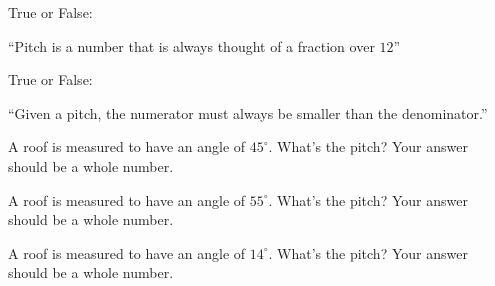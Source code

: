 \documentclass[noauthor,nooutcomes]{ximera}
\author{Bart Snapp}
\begin{document}
\maketitle


\begin{exercise}
  True or False:

  ``Pitch is a number that is always thought of a fraction over $12$''

  
\end{exercise}


\begin{exercise}
  True or False:
  
  ``Given a pitch, the numerator must always be smaller than the denominator.''
\end{exercise}

\begin{exercise}
  A roof is measured to have an angle of $45^\circ$. What's the pitch?
  Your answer should be a whole number.
\end{exercise}


\begin{exercise}
    A roof is measured to have an angle of $55^\circ$. What's the pitch?
  Your answer should be a whole number.
\end{exercise}



\begin{exercise}
  A roof is measured to have an angle of $14^\circ$. What's the pitch?
  Your answer should be a whole number.
\end{exercise}



\end{document}

